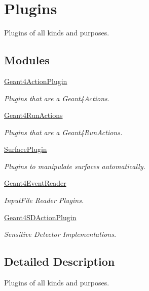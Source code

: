 \hypertarget{group___plugins}{
\section{Plugins}
\label{group___plugins}
}


Plugins of all kinds and purposes.  
\subsection*{Modules}
\begin{DoxyCompactItemize}
\item 
\hyperlink{group___geant4_action_plugin}{Geant4ActionPlugin}


\begin{DoxyCompactList}\small\item\em Plugins that are a Geant4Actions. \item\end{DoxyCompactList}\item 
\hyperlink{group___geant4_run_actions}{Geant4RunActions}


\begin{DoxyCompactList}\small\item\em Plugins that are a Geant4RunActions. \item\end{DoxyCompactList}\item 
\hyperlink{group___surface_plugin}{SurfacePlugin}


\begin{DoxyCompactList}\small\item\em Plugins to manipulate surfaces automatically. \item\end{DoxyCompactList}\item 
\hyperlink{group___geant4_event_reader}{Geant4EventReader}


\begin{DoxyCompactList}\small\item\em InputFile Reader Plugins. \item\end{DoxyCompactList}\item 
\hyperlink{group___geant4_s_d_action_plugin}{Geant4SDActionPlugin}


\begin{DoxyCompactList}\small\item\em Sensitive Detector Implementations. \item\end{DoxyCompactList}\end{DoxyCompactItemize}


\subsection{Detailed Description}
Plugins of all kinds and purposes. 
